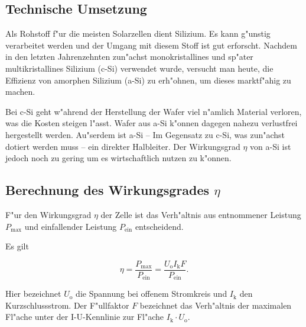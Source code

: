 	\subsection{Technische Umsetzung}
		\label{sub:umsetzung}
		Als Rohstoff f"ur die meisten Solarzellen dient Silizium.
		Es kann g"unstig verarbeitet werden und der Umgang mit diesem Stoff ist gut erforscht.
		Nachdem in den letzten Jahrenzehnten zun"achst monokristallines und sp"ater multikristallines Silizium (c-Si) verwendet wurde,
		versucht man heute, die Effizienz von amorphen Silizium (a-Si) zu erh"ohnen, um dieses marktf"ahig zu machen.

		Bei c-Si geht w"ahrend der Herstellung der Wafer viel n"amlich Material verloren, was die Kosten steigen l"asst.
		Wafer aus a-Si k"onnen dagegen nahezu verlustfrei hergestellt werden.
		Au"serdem ist a-Si -- Im Gegensatz zu c-Si, was zun"achst dotiert werden muss -- ein direkter Halbleiter.
		Der Wirkungsgrad $\eta$ von a-Si ist jedoch noch zu gering um es wirtschaftlich nutzen zu k"onnen.

	\subsection{Berechnung des Wirkungsgrades $\eta$}
		\label{subsec:wirkungsgrad}
		F"ur den Wirkungsgrad $\eta$ der Zelle ist das Verh"altnis aus entnommener Leistung $P_\mathrm{max}$ und einfallender Leistung $P_\mathrm{ein}$ entscheidend.

		Es gilt

		\begin{equation}
			\eta = \frac{P_\mathrm{max}}{P_\mathrm{ein}} = \frac{U_\mathrm{o} I_\mathrm{k} F}{P_\mathrm{ein}} .
		\end{equation}

		Hier bezeichnet $U_\mathrm{o}$ die Spannung bei offenem Stromkreis und $I_\mathrm{k}$ den Kurzschlussstrom. Der F"ullfaktor $F$ bezeichnet das Verh"altnis der maximalen Fl"ache unter der I-U-Kennlinie zur Fl"ache $I_\mathrm{k} \cdot U_\mathrm{o}$.